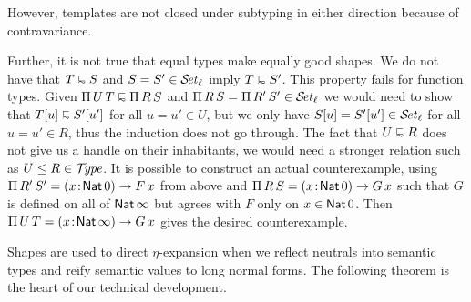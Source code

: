 \documentclass[acmlarge,review,anonymous]{acmart}\settopmatter{printfolios=true}
\begin{document}
However, templates are not closed under subtyping in either direction because of contravariance.

Further, it is not true that equal types make equally good shapes.  We do not have that
$T \shape S$ and $S = S' \in \SET[\ell]$ imply $T \shape S'$.  This property fails for function types.
Given $\piT U T \shape \piT R S$ and $\piT R S = \piT {R'}{S'} \in \SET[\ell]$ we would need to show that $T[u] \shape S'[u']$ for all $u = u' \in U$, but we only have $S[u] = S'[u'] \in \SET[\ell]$ for all $u = u' \in R$, thus the induction does not go through.  The fact that $U \shape R$ does not give us a handle on their inhabitants, we would need a stronger relation such as $U \leq R \in \TYPE$.
It is possible to construct an actual counterexample, using
$\piT {R'} S' =  \funT x {\Nat 0} {F\,x}$ from above and $\piT R S = \funT x {\Nat 0} {G\,x}$
such that $G$ is defined on all of $\Nat \infty$ but agrees with $F$ only on $x \in \Nat 0$.
Then $\piT U T = \funT x {\Nat \infty} {G\,x}$ gives the desired counterexample.




Shapes are used to direct $\eta$-expansion when we reflect neutrals into semantic types and reify semantic values to long normal forms.  The following theorem is the heart of our technical development.
\end{document}
